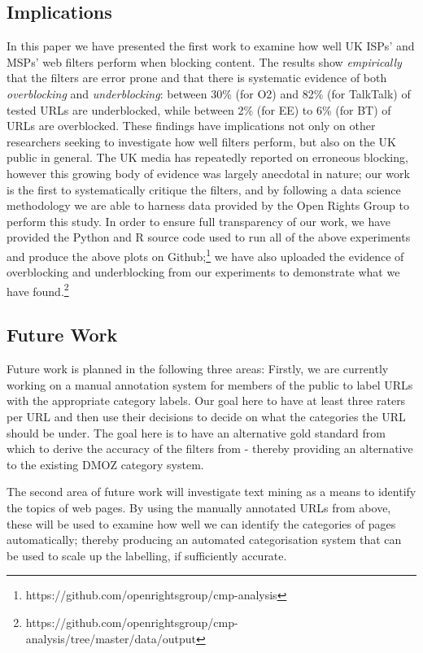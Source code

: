 \documentclass{bmcart}
\begin{document}
\subsection*{Implications}
In this paper we have presented the first work to examine how well UK ISPs' and MSPs' web filters perform when blocking content.
The results show \textit{empirically} that the filters are error prone and that there is systematic evidence of both \textit{overblocking} and \textit{underblocking}: between 30\% (for O2) and 82\% (for TalkTalk) of tested URLs are underblocked, while between 2\% (for EE) to 6\% (for BT) of URLs are overblocked.
These findings have implications not only on other researchers seeking to investigate how well filters perform, but also on the UK public in general.
The UK media has repeatedly reported on erroneous blocking, however this growing body of evidence was largely anecdotal in nature; our work is the first to systematically critique the filters, and by following a data science methodology we are able to harness data provided by the Open Rights Group to perform this study.
In order to ensure full transparency of our work, we have provided the Python and R source code used to run all of the above experiments and produce the above plots on Github;\footnote{https://github.com/openrightsgroup/cmp-analysis} we have also uploaded the evidence of overblocking and underblocking from our experiments to demonstrate what we have found.\footnote{https://github.com/openrightsgroup/cmp-analysis/tree/master/data/output}

\subsection*{Future Work}
Future work is planned in the following three areas:
Firstly, we are currently working on a manual annotation system for members of the public to label URLs with the appropriate category labels.
Our goal here to have at least three raters per URL and then use their decisions to decide on what the categories the URL should be under.
The goal here is to have an alternative gold standard from which to derive the accuracy of the filters from - thereby providing an alternative to the existing DMOZ category system.

The second area of future work will investigate text mining as a means to identify the topics of web pages.
By using the manually annotated URLs from above, these will be used to examine how well we can identify the categories of pages automatically; thereby producing an automated categorisation system that can be used to scale up the labelling, if sufficiently accurate.
\end{document}
